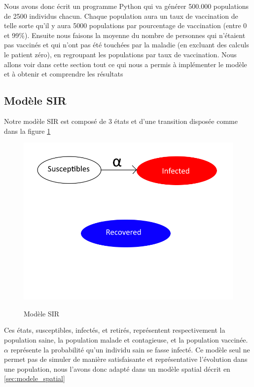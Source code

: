 \documentclass[journal, a4paper]{IEEEtran}
\begin{document}
	Nous avons donc écrit un programme Python qui va générer 500.000 populations de 2500 individus chacun. Chaque population aura un taux de vaccination de telle sorte qu'il y aura 5000 populations par pourcentage de vaccination (entre 0 et 99\%). Ensuite nous faisons la moyenne du nombre de personnes qui n'étaient pas vaccinés et qui n'ont pas été touchées par la maladie (en excluant des calculs le patient zéro), en regroupant les populations par taux de vaccination. Nous allons voir dans cette section tout ce qui nous a permis à implémenter le modèle et à obtenir et comprendre les résultats


	\subsection{Modèle SIR}
	Notre modèle SIR est composé de 3 états et d'une transition disposée comme dans la figure \ref{fig:MySIR}

	\begin{figure}[!hbt]
		\caption{Modèle SIR}
		\includegraphics[width=\columnwidth]{MySIR}
		\label{fig:MySIR}
	\end{figure}

	Ces états, susceptibles, infectés, et retirés, représentent respectivement la population saine, la population malade et contagieuse, et la population vaccinée. $\alpha$ représente la probabilité qu'un individu sain se fasse infecté.
	Ce modèle seul ne permet pas de simuler de manière satisfaisante et représentative l'évolution dans une population, nous l'avons donc adapté dans un modèle spatial décrit en \ref{sec:modele_spatial}
\end{document}
